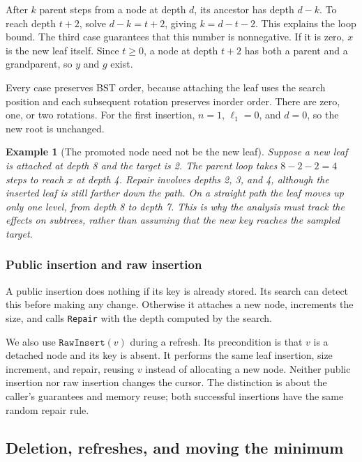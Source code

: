 \documentclass[11pt,a4paper]{article}
\theoremstyle{readable}
\newtheorem{example}[theorem]{Example}
\newcommand{\code}[1]{\texttt{#1}}
\begin{document}
After $k$ parent steps from a node at depth $d$, its ancestor has depth
$d-k$. To reach depth $t+2$, solve $d-k=t+2$, giving $k=d-t-2$.
This explains the loop bound. The third case guarantees that this
number is nonnegative. If it is zero, $x$ is the new leaf itself.
Since $t\ge0$, a node at depth $t+2$ has both a parent and a grandparent,
so $y$ and $g$ exist.

Every case preserves BST order, because attaching the leaf uses the
search position and each subsequent rotation preserves inorder order.
There are zero, one, or two rotations. For the first insertion, $n=1$,
$\ell_1=0$, and $d=0$, so the new root is unchanged.

\begin{example}[The promoted node need not be the new leaf]
Suppose a new leaf is attached at depth 8 and the target is 2. The
parent loop takes $8-2-2=4$ steps to reach $x$ at depth 4. Repair
involves depths 2, 3, and 4, although the inserted leaf is still
farther down the path. On a straight path the leaf moves up only one
level, from depth 8 to depth 7. This is why the analysis must track the
effects on subtrees, rather than assuming that the new key reaches
the sampled target.
\end{example}

\subsubsection*{Public insertion and raw insertion}
A public insertion does nothing if its key is already stored. Its search
can detect this before making any change. Otherwise it attaches a new
node, increments the size, and calls \code{Repair} with the depth
computed by the search.

We also use $\code{RawInsert}(v)$ during a refresh. Its precondition is
that $v$ is a detached node and its key is absent. It performs the same
leaf insertion, size increment, and repair, reusing $v$ instead of
allocating a new node. Neither public insertion nor raw insertion changes
the cursor. The distinction is about the caller's guarantees and memory
reuse; both successful insertions have the same random repair rule.

\subsection{Deletion, refreshes, and moving the minimum}
\label{sec:deletion}
\end{document}
